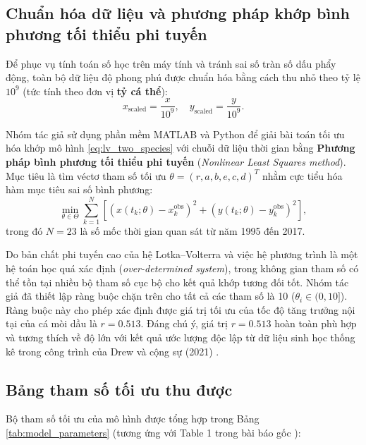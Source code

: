 \subsection{Chuẩn hóa dữ liệu và phương pháp khớp bình phương tối thiểu phi tuyến}
Để phục vụ tính toán số học trên máy tính và tránh sai số tràn số dấu phẩy động, toàn bộ dữ liệu độ phong phú được chuẩn hóa bằng cách thu nhỏ theo tỷ lệ $10^9$ (tức tính theo đơn vị \textbf{tỷ cá thể}):
\begin{equation}
x_{\text{scaled}} = \frac{x}{10^9}, \quad y_{\text{scaled}} = \frac{y}{10^9}.
\end{equation}

Nhóm tác giả sử dụng phần mềm MATLAB và Python để giải bài toán tối ưu hóa khớp mô hình \eqref{eq:lv_two_species} với chuỗi dữ liệu thời gian bằng \textbf{Phương pháp bình phương tối thiểu phi tuyến} (\textit{Nonlinear Least Squares method}). Mục tiêu là tìm véctơ tham số tối ưu $\theta = (r, a, b, e, c, d)^T$ nhằm cực tiểu hóa hàm mục tiêu sai số bình phương:
\begin{equation}
\min_{\theta \in \Theta} \sum_{k=1}^{N} \left[ \left(x(t_k; \theta) - x_k^{\text{obs}}\right)^2 + \left(y(t_k; \theta) - y_k^{\text{obs}}\right)^2 \right],
\end{equation}
trong đó $N = 23$ là số mốc thời gian quan sát từ năm 1995 đến 2017.

Do bản chất phi tuyến cao của hệ Lotka--Volterra và việc hệ phương trình là một hệ toán học quá xác định (\textit{over-determined system}), trong không gian tham số có thể tồn tại nhiều bộ tham số cục bộ cho kết quả khớp tương đối tốt. Nhóm tác giả đã thiết lập ràng buộc chặn trên cho tất cả các tham số là 10 ($\theta_i \in (0, 10]$). Ràng buộc này cho phép xác định được giá trị tối ưu của tốc độ tăng trưởng nội tại của cá mòi dầu là $r = 0.513$. Đáng chú ý, giá trị $r = 0.513$ hoàn toàn phù hợp và tương thích về độ lớn với kết quả ước lượng độc lập từ dữ liệu sinh học thống kê trong công trình của Drew và cộng sự (2021) \cite{drew2021balancing}.

\subsection{Bảng tham số tối ưu thu được}
Bộ tham số tối ưu của mô hình được tổng hợp trong Bảng \ref{tab:model_parameters} (tương ứng với Table 1 trong bài báo gốc \cite{panayotova2023bioeconomic}):

